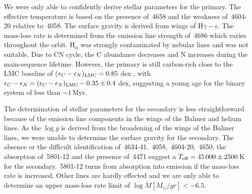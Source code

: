 \documentclass[fleqn,usenatbib]{mnras}
\begin{document}
We were only able to confidently derive stellar parameters for the primary. The effective temperature is based on the presence of \,4658 and the weakness of \,4604-20 relative to \,4058. The surface gravity is derived from wings of $\mathrm{H} {\gamma-\epsilon}$. %
The mass-loss rate is determined from the emission line strength of \,4686 which varies throughout the orbit. $\mathrm{H}_{\alpha}$ was strongly contaminated by nebular lines and was not suitable. Due to CN cycle, the C abundance decreases and N increases during the main-sequence lifetime. However, the primary is still carbon-rich  close to the LMC baseline of ($\epsilon_{C} - \epsilon_{N})_{\rm LMC} = 0.85$ dex \citep{brott2011}, with $\epsilon_{C} - \epsilon_{N} = (\epsilon_{C} - \epsilon_{N})_{\rm LMC} - 0.35 \pm 0.4$ dex, suggesting a young age for the binary system of less than $\sim 1$\,Myr.

The determination of stellar parameters for the secondary is less straightforward because of the emission line components in the wings of the Balmer and helium lines. As the $\log g$ is derived from the broadening of the wings of the Balmer lines, we were unable to determine the surface gravity for the secondary.
The absence or the difficult identification of \,4634-41, \,4058, \,4604-20, \,4650, the absorption of  \,5801-12 and the presence of \,4471 suggest a $T_{\rm eff} = 45\,000\pm 2500$\,K for the secondary. \,5801-12 turns from absorption into emission if the mass-loss rate is increased. Other lines are hardly effected and we are only able to determine an upper mass-loss rate limit of $\log \dot{M} [M_{\odot}/yr] < -6.5$. 

\end{document}

